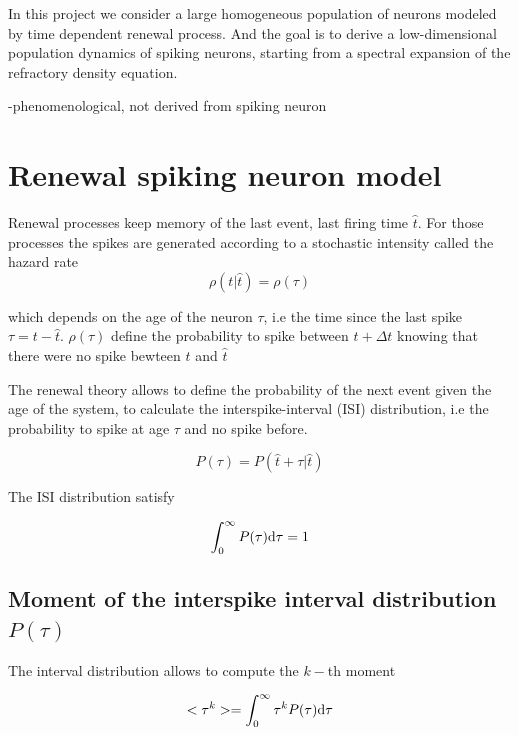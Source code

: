 \documentclass[12pt,twoside]{report}
\def \dd  {{\rm d}}
\begin{document}
In this project we consider a large homogeneous population of neurons modeled by time dependent renewal process. And the goal is to derive a low-dimensional population dynamics of spiking neurons, starting from a spectral expansion of the refractory density equation.

-phenomenological, not derived from spiking neuron %

\section{Renewal spiking neuron model}
\label{subsec:renew}

Renewal processes keep memory of the last event, last firing time $\hat{t}$. For those processes the spikes are generated according to a stochastic intensity called the hazard rate
\begin{equation}
\label{eq:rho1}
\rho(t|\hat{t})=\rho(\tau)
\end{equation}

which depends on the age of the neuron $\tau$, i.e the time since the last spike $\tau=t-\hat{t}$. $\rho(\tau)$ define the probability to spike between $t+\Delta t$ knowing that there were no spike bewteen $t$ and $\hat{t}$

The renewal theory allows to define the probability of the next event given the age of the system, to calculate the interspike-interval (ISI) distribution, i.e the probability to spike at age $\tau$ and no spike before.

\begin{equation}
\label{eq:P1}
P(\tau)=P(\hat{t}+\tau| \hat{t})
\end{equation}

The ISI distribution satisfy

\begin{equation}
\label{eq:Pnorm}
\int_0^\infty P(\tau)\dd\tau=1 
\end{equation}

\subsection{Moment of the interspike interval distribution $P(\tau)$}
The interval distribution allows to compute the $k-$th moment

\begin{equation}
\label{eq:Pmoment}
<\tau^k>=\int_0^\infty \tau^kP(\tau)\dd\tau
\end{equation}
\end{document}
